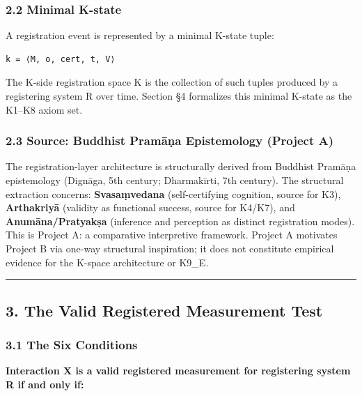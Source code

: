\documentclass[
  11pt,
]{article}
\begin{document}
\subsubsection{2.2 Minimal K-state}\label{minimal-k-state}

A registration event is represented by a minimal K-state tuple:

\begin{verbatim}
k = ⟨M, o, cert, t, V⟩
\end{verbatim}

The K-side registration space K is the collection of such tuples
produced by a registering system R over time. Section §4 formalizes this
minimal K-state as the K1--K8 axiom set.

\subsubsection{2.3 Source: Buddhist Pramāṇa Epistemology (Project
A)}\label{source-buddhist-pramux101ux1e47a-epistemology-project-a}

The registration-layer architecture is structurally derived from
Buddhist Pramāṇa epistemology (Dignāga, 5th century; Dharmakīrti, 7th
century). The structural extraction concerns: \textbf{Svasaṃvedana}
(self-certifying cognition, source for K3), \textbf{Arthakriyā}
(validity as functional success, source for K4/K7), and
\textbf{Anumāna/Pratyakṣa} (inference and perception as distinct
registration modes). This is Project A: a comparative interpretive
framework. Project A motivates Project B via one-way structural
inspiration; it does not constitute empirical evidence for the K-space
architecture or K9\_E.

\begin{center}\rule{0.5\linewidth}{0.5pt}\end{center}

\subsection{3. The Valid Registered Measurement
Test}\label{the-valid-registered-measurement-test}

\subsubsection{3.1 The Six Conditions}\label{the-six-conditions}

\textbf{Interaction X is a valid registered measurement for registering
system R if and only if:}
\end{document}
